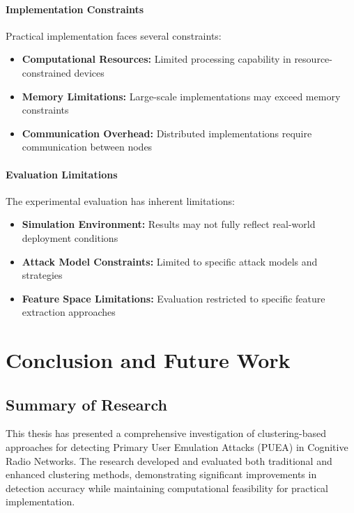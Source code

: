 \subsubsection{Implementation Constraints}
Practical implementation faces several constraints:
\begin{itemize}
\item \textbf{Computational Resources:} Limited processing capability in resource-constrained devices
\item \textbf{Memory Limitations:} Large-scale implementations may exceed memory constraints
\item \textbf{Communication Overhead:} Distributed implementations require communication between nodes
\end{itemize}

\subsubsection{Evaluation Limitations}
The experimental evaluation has inherent limitations:
\begin{itemize}
\item \textbf{Simulation Environment:} Results may not fully reflect real-world deployment conditions
\item \textbf{Attack Model Constraints:} Limited to specific attack models and strategies
\item \textbf{Feature Space Limitations:} Evaluation restricted to specific feature extraction approaches
\end{itemize}

\chapter{Conclusion and Future Work}

\section{Summary of Research}
This thesis has presented a comprehensive investigation of clustering-based approaches for detecting Primary User Emulation Attacks (PUEA) in Cognitive Radio Networks. The research developed and evaluated both traditional and enhanced clustering methods, demonstrating significant improvements in detection accuracy while maintaining computational feasibility for practical implementation.

